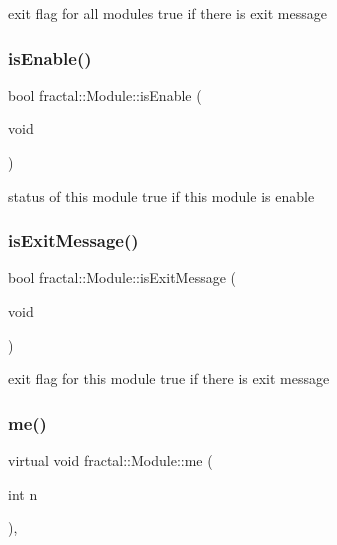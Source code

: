 exit flag for all modules  true if there is exit message 

\mbox{\label{classfractal_1_1Module_a74c4dc6f8d5f57d885b0da633ec12e1f}} 
\subsubsection{\texorpdfstring{is\+Enable()}{isEnable()}}
{\footnotesize\ttfamily bool fractal\+::\+Module\+::is\+Enable (\begin{DoxyParamCaption}\item[{void}]{ }\end{DoxyParamCaption})\hspace{0.3cm}{\ttfamily [inline]}}



status of this module  true if this module is enable 

\mbox{\label{classfractal_1_1Module_a9b79e3353f502cb49f7bb713266ebdef}} 
\subsubsection{\texorpdfstring{is\+Exit\+Message()}{isExitMessage()}}
{\footnotesize\ttfamily bool fractal\+::\+Module\+::is\+Exit\+Message (\begin{DoxyParamCaption}\item[{void}]{ }\end{DoxyParamCaption})\hspace{0.3cm}{\ttfamily [inline]}}



exit flag for this module  true if there is exit message 

\mbox{\label{classfractal_1_1Module_a92deaafb88a2bc34958dca99fdc112a3}} 
\subsubsection{\texorpdfstring{me()}{me()}}
{\footnotesize\ttfamily virtual void fractal\+::\+Module\+::me (\begin{DoxyParamCaption}\item[{int}]{n }\end{DoxyParamCaption})\hspace{0.3cm}{\ttfamily [inline]}, {\ttfamily [virtual]}}



